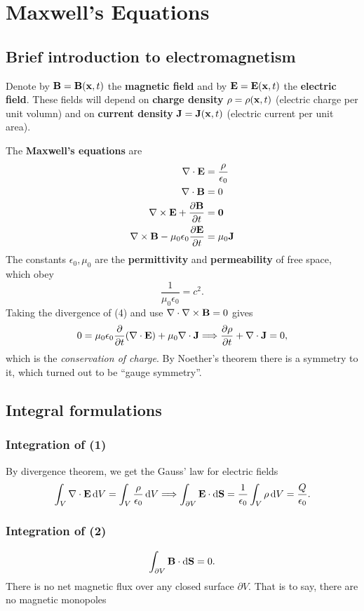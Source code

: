 \section{Maxwell's Equations}
\subsection{Brief introduction to electromagnetism}
\begin{definition}
    Denote by $ {\bf B} = {\bf B}({\bf x},t) $ the \textbf{magnetic field} and by $ {\bf E}={\bf E}({\bf x},t) $ the \textbf{electric field}. These fields will depend on \textbf{charge density} $ \rho = \rho({\bf x},t) $ (electric charge per unit volumn) and on \textbf{current density} $ {\bf J} = {\bf J}({\bf x},t) $ (electric current per unit area).
\end{definition}
The \textbf{Maxwell's equations} are 
\begin{align}
    \nabla\cdot {\bf E} &= \frac{\rho}{\epsilon_0}\\ 
    \nabla\cdot{\bf B}&= 0\\ 
    \nabla\times{\bf E}+\frac{\partial {\bf B}}{\partial t}&=\mathbf{0} \\ 
    \nabla\times{\bf B}-\mu_0 \epsilon_0 \frac{\partial {\bf E}}{\partial t}&=\mu_0 {\bf J} 
\end{align}
The constants $ \epsilon_0,\mu_0 $ are the \textbf{permittivity} and \textbf{permeability} of free space, which obey 
\[
    \frac{1}{\mu_0 \epsilon_0}=c^2.
\]
Taking the divergence of (4) and use $ \nabla\cdot\nabla\times{\bf B}=0 $ gives
\[
    0 = \mu_0 \epsilon_0 \frac{\partial }{\partial t}(\nabla\cdot{\bf E})+\mu_0 \nabla\cdot{\bf J} \Longrightarrow \frac{\partial \rho}{\partial t}+\nabla\cdot{\bf J}=0,  
\]
which is the \textit{conservation of charge}. By Noether's theorem there is a symmetry to it, which turned out to be ``gauge symmetry''.

\subsection{Integral formulations}
\subsubsection*{Integration of (1)}
By divergence theorem, we get the Gauss’ law for electric fields
\[
    \int_{V} \nabla\cdot{\bf E} \,\mathrm{d}V  =  \int_{V} \frac{\rho}{\epsilon_0} \,\mathrm{d}V 
    \Longrightarrow  \int_{\partial V} {\bf E} \cdot\mathrm{d}\mathbf{S} =\frac{1}{\epsilon_0} \int_{V} \rho \,\mathrm{d}V = \frac{Q}{\epsilon_0} .
\]
\subsubsection*{Integration of (2)}
\[
    \int_{\partial V} {\bf B} \cdot\mathrm{d}\mathbf{S} = 0.
\]
There is no net magnetic flux over any closed surface $ \partial V $. That is to say, there are no magnetic monopoles
